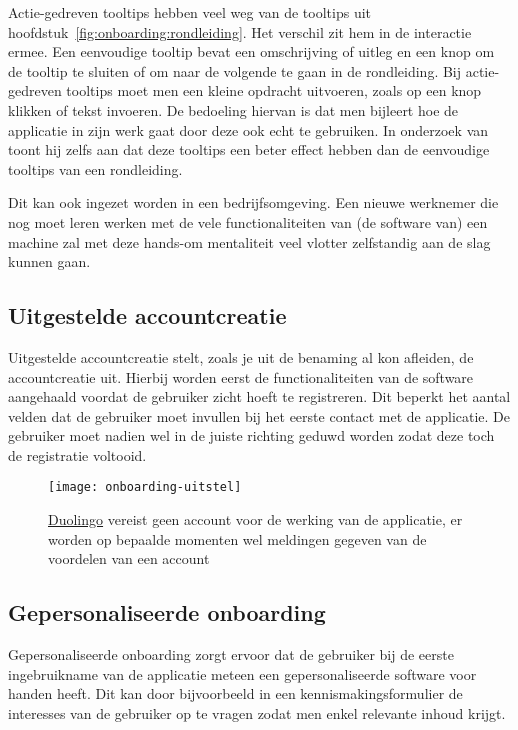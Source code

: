 Actie-gedreven tooltips hebben veel weg van de tooltips uit hoofdstuk~\ref{fig:onboarding:rondleiding}. Het verschil zit hem in de interactie ermee. Een eenvoudige tooltip bevat een omschrijving of uitleg en een knop om de tooltip te sluiten of om naar de volgende te gaan in de rondleiding. Bij actie-gedreven tooltips moet men een kleine opdracht uitvoeren, zoals op een knop klikken of tekst invoeren. De bedoeling hiervan is dat men bijleert hoe de applicatie in zijn werk gaat door deze ook echt te gebruiken. In onderzoek van~\textcite{Oliveira2019} toont hij zelfs aan dat deze tooltips een beter effect hebben dan de eenvoudige tooltips van een rondleiding.

Dit kan ook ingezet worden in een bedrijfsomgeving. Een nieuwe werknemer die nog moet leren werken met de vele functionaliteiten van (de software van) een machine zal met deze hands-om mentaliteit veel vlotter zelfstandig aan de slag kunnen gaan.

\subsection{Uitgestelde accountcreatie}
\label{sec:onboarding:uitgestelde-accountcreatie}

Uitgestelde accountcreatie stelt, zoals je uit de benaming al kon afleiden, de accountcreatie uit. Hierbij worden eerst de functionaliteiten van de software aangehaald voordat de gebruiker zicht hoeft te registreren. Dit beperkt het aantal velden dat de gebruiker moet invullen bij het eerste contact met de applicatie. De gebruiker moet nadien wel in de juiste richting geduwd worden zodat deze toch de registratie voltooid.

\begin{figure}[h!]
    \centering
    \texttt{[image: onboarding-uitstel]}
    \caption[Voorbeeld uitgestelde accountcreatie]{\href{https://www.duolingo.com/}{Duolingo} vereist geen account voor de werking van de applicatie, er worden op bepaalde momenten wel meldingen gegeven van de voordelen van een account}
    \label{fig:onboarding:uitgestelde-accountcreatie}
\end{figure}

\subsection{Gepersonaliseerde onboarding}
\label{sec:onboarding:gepersonaliseerd}

Gepersonaliseerde onboarding zorgt ervoor dat de gebruiker bij de eerste ingebruikname van de applicatie meteen een gepersonaliseerde software voor handen heeft. Dit kan door bijvoorbeeld in een kennismakingsformulier de interesses van de gebruiker op te vragen zodat men enkel relevante inhoud krijgt.

